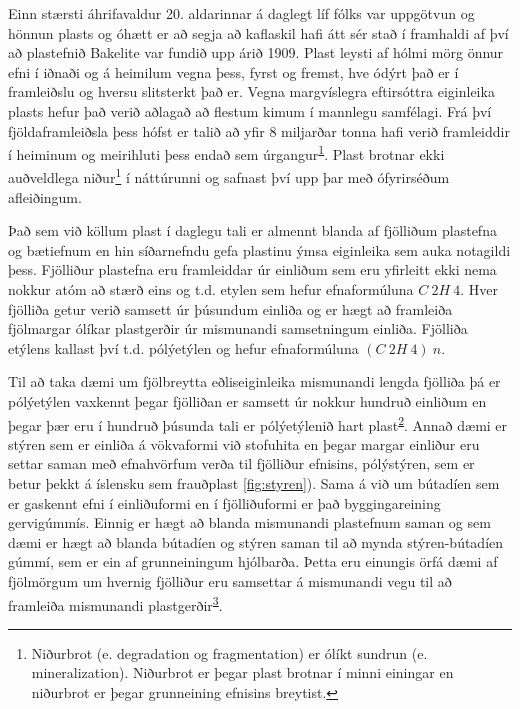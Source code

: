 \documentclass[icelandic,]{book}
\let\rmarkdownfootnote\footnote%
\def\footnote{\protect\rmarkdownfootnote}
\begin{document}
Einn stærsti áhrifavaldur 20. aldarinnar á daglegt líf fólks var uppgötvun og hönnun plasts og óhætt er að segja að kaflaskil hafi átt sér stað í framhaldi af því að plastefnið Bakelite var fundið upp árið 1909. Plast leysti af hólmi mörg önnur efni í iðnaði og á heimilum vegna þess, fyrst og fremst, hve ódýrt það er í framleiðslu og hversu slitsterkt það er. Vegna margvíslegra eftirsóttra eiginleika plasts hefur það verið aðlagað að flestum kimum í mannlegu samfélagi. Frá því fjöldaframleiðsla þess hófst er talið að yfir 8 miljarðar tonna hafi verið framleiddir í heiminum og meirihluti þess endað sem úrgangur\textsuperscript{\protect\hyperlink{ref-geyer2017production}{1}}. Plast brotnar ekki auðveldlega niður\footnote{Niðurbrot (e. degradation og fragmentation) er ólíkt sundrun (e. mineralization). Niðurbrot er þegar plast brotnar í minni einingar en niðurbrot er þegar grunneining efnisins breytist.} í náttúrunni og safnast því upp þar með ófyrirséðum afleiðingum.

Það sem við köllum plast í daglegu tali er almennt blanda af fjölliðum plastefna og bætiefnum en hin síðarnefndu gefa plastinu ýmsa eiginleika sem auka notagildi þess. Fjölliður plastefna eru framleiddar úr einliðum sem eru yfirleitt ekki nema nokkur atóm að stærð eins og t.d. etylen sem hefur efnaformúluna \(C~2H~4\). Hver fjölliða getur verið samsett úr þúsundum einliða og er hægt að framleiða fjölmargar ólíkar plastgerðir úr mismunandi samsetningum einliða. Fjölliða etýlens kallast því t.d. pólýetýlen og hefur efnaformúluna \((C~2H~4)~n\).

Til að taka dæmi um fjölbreytta eðliseiginleika mismunandi lengda fjölliða þá er pólýetýlen vaxkennt þegar fjölliðan er samsett úr nokkur hundruð einliðum en þegar þær eru í hundruð þúsunda tali er pólýetýlenið hart plast\textsuperscript{\protect\hyperlink{ref-Andrady2017}{2}}. Annað dæmi er stýren sem er einliða á vökvaformi við stofuhita en þegar margar einliður eru settar saman með efnahvörfum verða til fjölliður efnisins, pólýstýren, sem er betur þekkt á íslensku sem frauðplast \ref{fig:styren}). Sama á við um bútadíen sem er gaskennt efni í einliðuformi en í fjölliðuformi er það byggingareining gervigúmmís. Einnig er hægt að blanda mismunandi plastefnum saman og sem dæmi er hægt að blanda bútadíen og stýren saman til að mynda stýren-bútadíen gúmmí, sem er ein af grunneiningum hjólbarða. Þetta eru einungis örfá dæmi af fjölmörgum um hvernig fjölliður eru samsettar á mismunandi vegu til að framleiða mismunandi plastgerðir\textsuperscript{\protect\hyperlink{ref-Gowariker2005}{3}}.
\end{document}
